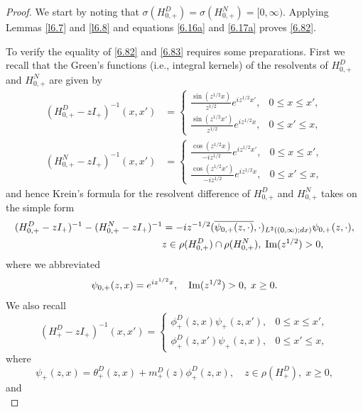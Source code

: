 \documentclass[reqno,10pt, centertags]{amsart}
\newcommand{\no}{\nonumber}
\newcommand{\lb}{\label}
\newcommand{\f}{\frac}
\newcommand{\ol}{\overline}
\newcommand{\si}{\sigma}
\renewcommand{\Im}{\text{\rm Im}}
\numberwithin{equation}{section}
\theoremstyle{definition}
\begin{document}
\begin{proof}
We start by noting that $\si(H_{0,+}^D)=\si(H_{0,+}^N)=[0,\infty)$.
Applying Lemmas \ref{l6.7} and \ref{l6.8} and equations \eqref{6.16a}
and \eqref{6.17a} proves \eqref{6.82}.

To verify the equality of \eqref{6.82} and \eqref{6.83} requires some
preparations. First we recall that the Green's functions (i.e., integral
kernels) of the resolvents of $H^D_{0,+}$ and $H^N_{0,+}$ are given by
\begin{align}
(H^D_{0,+} -zI_+)^{-1}(x,x')&=\begin{cases} \f{\sin(z^{1/2}x)}{z^{1/2}}
e^{i z^{1/2}x'}, & 0\leq x\leq x', \\
\f{\sin(z^{1/2}x')}{z^{1/2}}
e^{i z^{1/2}x}, & 0\leq x' \leq x, \end{cases}   \\
(H^N_{0,+} -zI_+)^{-1}(x,x')&=\begin{cases} \f{\cos(z^{1/2}x)}{-i z^{1/2}}
e^{i z^{1/2}x'}, & 0\leq x\leq x', \\
\f{\cos(z^{1/2}x')}{-i z^{1/2}}
e^{i z^{1/2}x}, & 0\leq x' \leq x, \end{cases}
\end{align}
and hence Krein's formula for the resolvent difference of $H^D_{0,+}$ and
$H^N_{0,+}$ takes on the simple form
\begin{align}
&(H^D_{0,+} -zI_+)^{-1}-(H^N_{0,+} -zI_+)^{-1}=-i z^{-1/2}
(\ol{\psi_{0,+}(z,\cdot)}, \cdot)_{L^2((0,\infty);dx)}\psi_{0,+}(z,\cdot),
\no  \\
& \hspace*{5.2cm}  z\in\rho(H^D_{0,+})\cap\rho(H^N_{0,+}), \;
\Im(z^{1/2})>0,   \lb{6.22a}
\end{align}
where we abbreviated
\begin{equation}
\psi_{0,+}(z,x)= e^{i z^{1/2}x}, \quad \Im(z^{1/2})>0, \; x\geq 0.
\end{equation}
We also recall
\begin{equation}
(H^D_{+} -zI_+)^{-1}(x,x')=\begin{cases} \phi^D_+(z,x) \psi_+(z,x'), &
0\leq x\leq x', \\
\phi^D_+(z,x') \psi_+(z,x), & 0\leq x' \leq x, \end{cases}
\end{equation}
where
\begin{equation}
\psi_+(z,x)=\theta^D_+(z,x) + m^D_+(z) \phi^D_+(z,x), \quad
z\in\rho(H^D_+), \; x\geq 0,
\end{equation}
and
\begin{equation}

\end{equation}
\end{proof}
\end{document}
